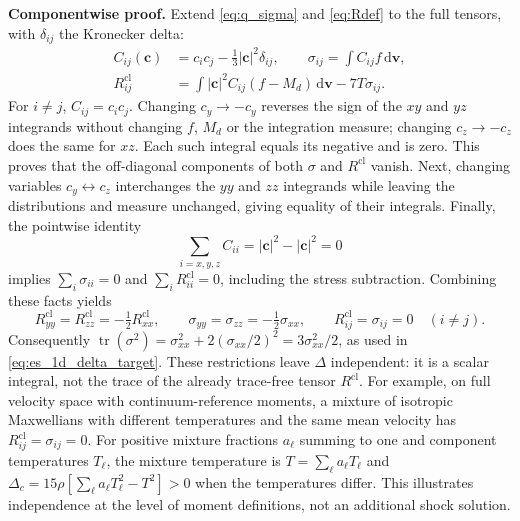 \documentclass[lineno,paper]{JFM-FLM_Au}
\newenvironment{revision}{\nolinenumbers\begin{tcolorbox}[breakable,colback=revisionyellow,colframe=revisionyellow,boxrule=0pt,arc=0pt,left=5pt,right=5pt,top=5pt,bottom=5pt,before skip=6pt,after skip=6pt]\captionsetup{width=\linewidth}}{\end{tcolorbox}\linenumbers}
\newenvironment{revision}{}{}
\newcommand{\dd}{\mathrm{d}}
\newcommand{\cl}{\mathrm{cl}}
\newcommand{\tr}{\operatorname{tr}}
\begin{document}
\begin{revision}
\textbf{Componentwise proof.} Extend \eqref{eq:q_sigma} and \eqref{eq:Rdef} to the full tensors, with $\delta_{ij}$ the Kronecker delta:
\begin{equation}
\begin{split}
 C_{ij}(\boldsymbol c)&=c_i c_j-\tfrac13|\boldsymbol c|^2\delta_{ij},
 \qquad \sigma_{ij}=\int C_{ij}f\,\dd\boldsymbol v,\\
 R^{\cl}_{ij}&=\int |\boldsymbol c|^2 C_{ij}(f-M_d)\,\dd\boldsymbol v
                 -7T\sigma_{ij}.
\end{split}
\label{eq:full_R_tensor}
\end{equation}
For $i\ne j$, $C_{ij}=c_i c_j$. Changing $c_y\to-c_y$ reverses the sign of the $xy$ and $yz$ integrands without changing $f$, $M_d$ or the integration measure; changing $c_z\to-c_z$ does the same for $xz$. Each such integral equals its negative and is zero. This proves that the off-diagonal components of both $\sigma$ and $R^{\cl}$ vanish. Next, changing variables $c_y\leftrightarrow c_z$ interchanges the $yy$ and $zz$ integrands while leaving the distributions and measure unchanged, giving equality of their integrals. Finally, the pointwise identity
\[
 \sum_{i=x,y,z} C_{ii}=|\boldsymbol c|^2-|\boldsymbol c|^2=0
\]
implies $\sum_i\sigma_{ii}=0$ and $\sum_i R^{\cl}_{ii}=0$, including the stress subtraction. Combining these facts yields
\begin{equation}
 R^{\cl}_{yy}=R^{\cl}_{zz}=-\tfrac12R^{\cl}_{xx},\qquad
 \sigma_{yy}=\sigma_{zz}=-\tfrac12\sigma_{xx},\qquad
 R^{\cl}_{ij}=\sigma_{ij}=0\quad(i\ne j).
 \label{eq:normal_shock_tensor_reduction}
\end{equation}
Consequently $\tr(\sigma^2)=\sigma_{xx}^2+2(\sigma_{xx}/2)^2=3\sigma_{xx}^2/2$, as used in \eqref{eq:es_1d_delta_target}. These restrictions leave $\Delta$ independent: it is a scalar integral, not the trace of the already trace-free tensor $R^{\cl}$. For example, on full velocity space with continuum-reference moments, a mixture of isotropic Maxwellians with different temperatures and the same mean velocity has $R^{\cl}_{ij}=\sigma_{ij}=0$. For positive mixture fractions $a_\ell$ summing to one and component temperatures $T_\ell$, the mixture temperature is $T=\sum_\ell a_\ell T_\ell$ and $\Delta_c=15\rho[\sum_\ell a_\ell T_\ell^2-T^2]>0$ when the temperatures differ. This illustrates independence at the level of moment definitions, not an additional shock solution.
\end{revision}
\end{document}
